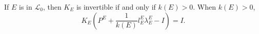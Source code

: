 If $E$ is in $\mathcal{L}_0$, then $K_E$ is invertible if and only if $k(E) > 0$. When $k(E) > 0$,
$$K_E \left( P^E + \frac{1}{k(E)} l_E^E \lambda_E^E - I \right) = I.$$
